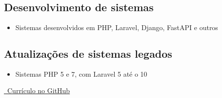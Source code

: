 \documentclass{article}
\begin{document}
\subsection{Desenvolvimento de sistemas}
\begin{itemize}
  \item Sistemas desenvolvidos em PHP, Laravel, Django, FastAPI e outros 
\end{itemize}

\subsection{Atualizações de sistemas legados}
\begin{itemize}
  \item Sistemas PHP 5 e 7, com Laravel 5 até o 10
\end{itemize}




\href{https://github.com/PedroPaulo-98/Curriculo}{\faGithub\ Currículo no GitHub}
\end{document}
